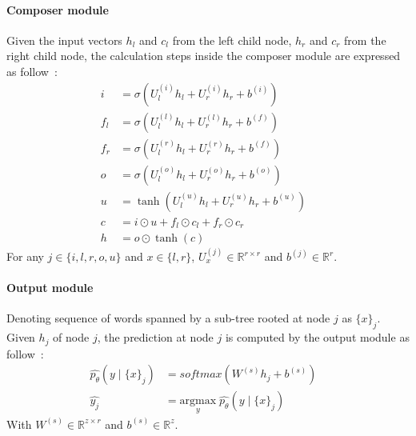 \paragraph{Composer module}
Given the input vectors \({h_l}\) and \({c_l}\) from the left child node, \({h_r}\) and \({c_r}\) from the right child node, the calculation steps inside the composer module are expressed as follow~\cite{treeLSTM}:
\begin{align}
i &= \sigma{ \left(U_l^{(i)} h_{l} + U_r^{(i)} h_{r} + b^{(i)} \right) } &\\
f_{l} &= \sigma{\left(U_{l}^{(l)} h_{l} + U_{r}^{(l)} h_{r} + b^{(f)}\right)} & \\
f_{r} &= \sigma{\left(U_{l}^{(r)} h_{l} + U_{r}^{(r)} h_{r} + b^{(f)}\right)} & \\
o &= \sigma{\left( U_l^{(o)} h_{l} + U_r^{(o)} h_{r} + b^{(o)}\right)} &\\
u &= \tanh{\left( U_l^{(u)} h_{l} + U_r^{(u)} h_{r} + b^{(u)}\right)} &\\
c &= i \odot u + f_{l} \odot c_{l} + f_{r} \odot c_{r} & \\
h &= o \odot \tanh{\left(c\right)} &
\end{align}
For any \(j \in \{i, l, r, o, u\}\) and \(x \in \{l, r\}\), \(U_x^{(j)} \in \mathbb{R}^{r \times r}\) and \( b^{(j)} \in \mathbb{R}^r\).

\paragraph{Output module}
Denoting sequence of words spanned by a sub-tree rooted at node \({j}\) as \({\{x\}_j}\).
Given \({h_j}\) of node \({j}\), the prediction at node \({j}\) is computed by the output module as follow~\cite{treeLSTM}:
\begin{align}
\hat{p_{\theta}}(y \mid \{x\}_j ) &= softmax( W^{(s)} h_j + b^{(s)}) & \\
\hat{y_j} &= \underset{y}{\mathrm{argmax}} \; \hat{p_{\theta}}(y \mid \{x\}_j ) &
\end{align}
With \(W^{(s)} \in \mathbb{R}^{z \times r}\) and \( b^{(s)} \in \mathbb{R}^z\).
